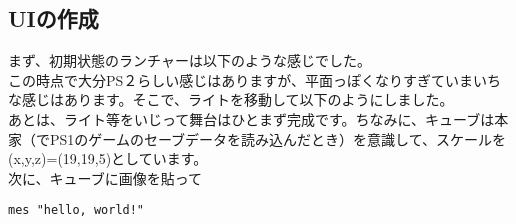 \documentclass[b5paper,11pt]{jsarticle}
\begin{document}
\begin{multicols*}{3}
\section{UIの作成}
まず、初期状態のランチャーは以下のような感じでした。\\
この時点で大分PS２らしい感じはありますが、平面っぽくなりすぎていまいちな感じはあります。そこで、ライトを移動して以下のようにしました。\\
あとは、ライト等をいじって舞台はひとまず完成です。ちなみに、キューブは本家（でPS1のゲームのセーブデータを読み込んだとき）を意識して、スケールを(x,y,z)=(19,19,5)としています。\\
次に、キューブに画像を貼って

\begin{lstlisting}[caption=Sample]
mes "hello, world!"
\end{lstlisting}

\end{multicols*}
\end{document}

